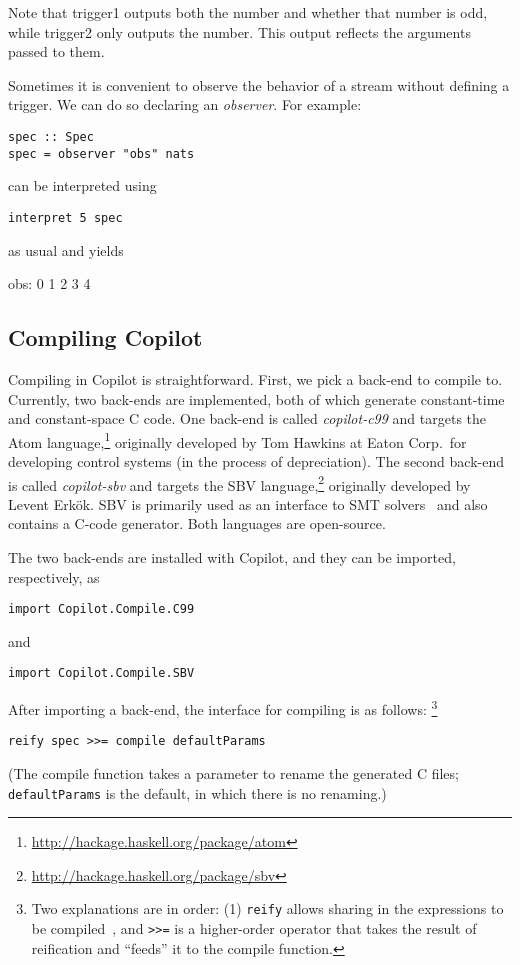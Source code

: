 Note that trigger1 outputs both the number and whether that number is odd, while trigger2 only outputs the
number. This output reflects the arguments passed to them. 

Sometimes it is convenient to observe the behavior of a stream without defining
a trigger. We can do so declaring an \emph{observer}. For example:
%
\begin{lstlisting}[language = Copilot]
spec :: Spec
spec = observer "obs" nats
\end{lstlisting}
%
can be interpreted using
%
\begin{lstlisting}[language = Copilot]
interpret 5 spec
\end{lstlisting}
%
as usual and yields
%
\begin{code}
obs:
0
1
2
3
4
\end{code}

\subsection{Compiling Copilot} \label{sec:compiling}

Compiling in Copilot is
straightforward. First, we pick a back-end to compile to. Currently, two
back-ends are implemented, both of which generate constant-time and
constant-space C code. One back-end is called \emph{copilot-c99} and targets
the Atom language,\footnote{\url{http://hackage.haskell.org/package/atom}}
originally developed by Tom Hawkins at Eaton Corp.\ for developing control
systems (in the process of depreciation). The second back-end is called \emph{copilot-sbv} and targets the SBV
language,\footnote{\url{http://hackage.haskell.org/package/sbv}} originally
developed by Levent Erk\"{o}k. SBV is primarily used as an interface to SMT
solvers~\cite{smt} and also contains a C-code generator. Both languages are
open-source.

The two back-ends are installed with Copilot, and they can be imported,
respectively, as

\begin{lstlisting}[language = Copilot]
import Copilot.Compile.C99
\end{lstlisting}
\noindent
and
\begin{lstlisting}[language = Copilot]
import Copilot.Compile.SBV
\end{lstlisting}

After importing a back-end, the interface for compiling is as
follows:
%
\footnote{Two explanations are in order: (1) {\tt reify} allows sharing in the
expressions to be compiled~\cite{DSLExtract}, and {\tt >>=} is a higher-order
operator that takes the result of reification and ``feeds'' it to the compile
function.}
%
\begin{lstlisting}[language = Copilot]
reify spec >>= compile defaultParams
\end{lstlisting}
%
\noindent
(The compile function takes a parameter to rename the generated C files; {\tt
defaultParams} is the default, in which there is no renaming.)

